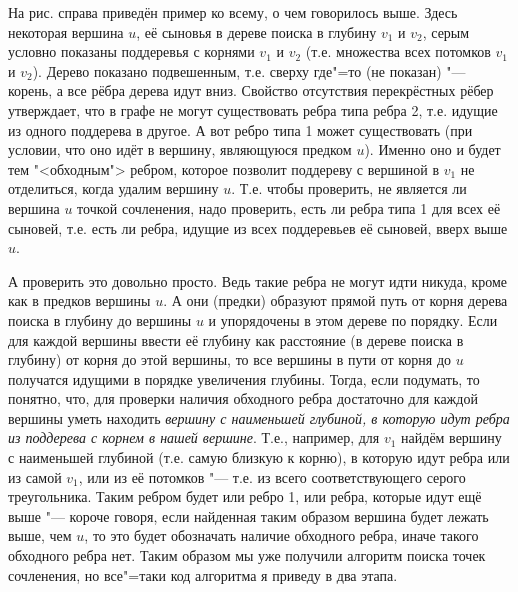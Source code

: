 На рис. справа приведён пример ко всему, о чем говорилось выше. Здесь некоторая вершина $u$, её сыновья
в дереве поиска в глубину $v_1$ и $v_2$, серым условно показаны поддеревья с корнями $v_1$ и $v_2$
(т.е. множества всех потомков $v_1$ и $v_2$). Дерево показано подвешенным, т.е. сверху где"=то (не показан)
"--- корень, а все рёбра дерева идут вниз. Свойство отсутствия перекрёстных рёбер утверждает, что
в графе не могут существовать ребра типа ребра 2, т.е. идущие из одного поддерева в другое.
А вот ребро типа 1 может существовать (при условии, что оно идёт в вершину, являющуюся предком $u$). 
Именно оно и будет тем "<обходным">
ребром, которое позволит поддереву с вершиной в $v_1$ не отделиться, когда удалим вершину $u$. Т.е.
чтобы проверить, не является ли вершина $u$ точкой сочленения, надо проверить, есть ли ребра типа 1
для всех её сыновей, т.е. есть ли ребра, идущие из всех поддеревьев её сыновей, вверх выше $u$.

А проверить это довольно просто. Ведь такие ребра не могут идти никуда, кроме как в предков вершины
$u$. А они (предки) образуют прямой путь от корня дерева поиска в глубину до вершины $u$ и упорядочены
в этом дереве по порядку. Если для каждой вершины ввести её глубину как расстояние (в дереве поиска в глубину)
от корня до этой вершины, то все вершины в пути от корня до $u$ получатся идущими в порядке увеличения глубины.
Тогда, если подумать, то понятно, что, для проверки наличия обходного ребра достаточно для
каждой вершины уметь находить \textit{вершину с наименьшей глубиной, в которую идут ребра из поддерева с корнем
в нашей вершине}. Т.е., например, для $v_1$ найдём вершину с наименьшей глубиной (т.е. самую близкую к корню),
в которую идут ребра или из самой $v_1$, или из её потомков "--- т.е. из всего соответствующего серого
треугольника. Таким ребром будет или ребро 1, или ребра, которые идут ещё выше "--- короче говоря, если
найденная таким образом вершина будет лежать выше, чем $u$, то это будет обозначать наличие обходного ребра,
иначе такого обходного ребра нет. Таким образом мы уже получили алгоритм поиска точек сочленения,
но все"=таки код алгоритма я приведу в два этапа.

